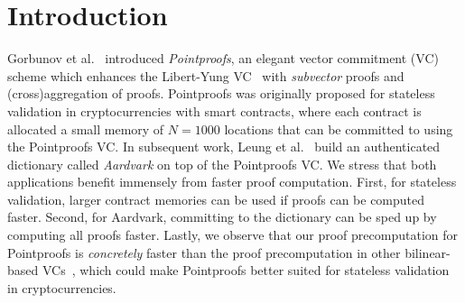 \section{Introduction}

Gorbunov et al.~\cite{GRWZ20} introduced \textit{Pointproofs}, an elegant vector commitment (VC) scheme which enhances the Libert-Yung VC~\cite{LY10} with \textit{subvector} proofs and (cross)aggregation of proofs.
Pointproofs was originally proposed for stateless validation in cryptocurrencies with smart contracts, where each contract is allocated a small memory of $N=1000$ locations that can be committed to using the Pointproofs VC.
In subsequent work, Leung et al.~\cite{LGG+20} build an authenticated dictionary called \textit{Aardvark} on top of the Pointproofs VC.
We stress that both applications benefit immensely from faster proof computation.
First, for stateless validation, larger contract memories can be used if proofs can be computed faster.
Second, for Aardvark, committing to the dictionary can be sped up by computing all proofs faster.
Lastly, we observe that our proof precomputation for Pointproofs is \textit{concretely} faster than the proof precomputation in other bilinear-based VCs~\cite{TAB+20}, which could make Pointproofs better suited for stateless validation in cryptocurrencies.